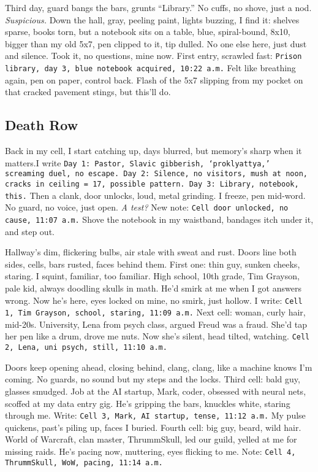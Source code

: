 \documentclass[12pt]{article}
\newcommand{\note}[1]{\texttt{#1}}
\begin{document}
{Third day, guard bangs the bars, grunts “Library.” No cuffs, no shove, just a nod. \textit{Suspicious.} Down the hall, gray, peeling paint, lights buzzing, I find it: shelves sparse, books torn, but a notebook sits on a table, blue, spiral-bound, 8x10, bigger than my old 5x7, pen clipped to it, tip dulled. No one else here, just dust and silence. Took it, no questions, mine now. First entry, scrawled fast: \note{Prison library, day 3, blue notebook acquired, 10:22 a.m.} Felt like breathing again, pen on paper, control back. Flash of the 5x7 slipping from my pocket on that cracked pavement stings, but this’ll do.

\subsection*{Death Row}
Back in my cell, I start catching up, days blurred, but memory’s sharp when it matters.I write \note{Day 1: Pastor, Slavic gibberish, ‘proklyattya,’ screaming duel, no escape. Day 2: Silence, no visitors, mush at noon, cracks in ceiling = 17, possible pattern. Day 3: Library, notebook, this.} Then a clank, door unlocks, loud, metal grinding. I freeze, pen mid-word. No guard, no voice, just open. \textit{A test?} New note: \note{Cell door unlocked, no cause, 11:07 a.m.} Shove the notebook in my waistband, bandages itch under it, and step out.

Hallway’s dim, flickering bulbs, air stale with sweat and rust. Doors line both sides, cells, bars rusted, faces behind them. First one: thin guy, sunken cheeks, staring. I squint, familiar, too familiar. High school, 10th grade, Tim Grayson, pale kid, always doodling skulls in math. He’d smirk at me when I got answers wrong. Now he’s here, eyes locked on mine, no smirk, just hollow. I write: \note{Cell 1, Tim Grayson, school, staring, 11:09 a.m.} Next cell: woman, curly hair, mid-20s. University, Lena from psych class, argued Freud was a fraud. She’d tap her pen like a drum, drove me nuts. Now she’s silent, head tilted, watching. \note{Cell 2, Lena, uni psych, still, 11:10 a.m.}

Doors keep opening ahead, closing behind, clang, clang, like a machine knows I’m coming. No guards, no sound but my steps and the locks. Third cell: bald guy, glasses smudged. Job at the AI startup, Mark, coder, obsessed with neural nets, scoffed at my data entry gig. He’s gripping the bars, knuckles white, staring through me. Write: \note{Cell 3, Mark, AI startup, tense, 11:12 a.m.} My pulse quickens, past’s piling up, faces I buried. Fourth cell: big guy, beard, wild hair. World of Warcraft, clan master, ThrummSkull, led our guild, yelled at me for missing raids. He’s pacing now, muttering, eyes flicking to me. Note: \note{Cell 4, ThrummSkull, WoW, pacing, 11:14 a.m.}

}
\end{document}
